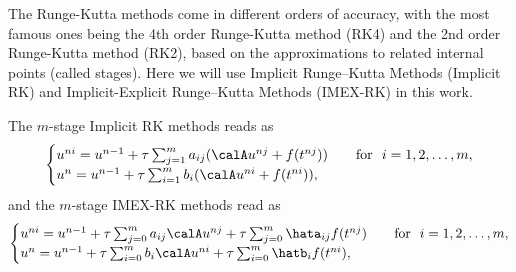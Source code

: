 The Runge-Kutta methods come in different orders of accuracy, 
with the most famous ones being the 4th order Runge-Kutta method 
(RK4) and the 2nd order Runge-Kutta method (RK2), 
based on the approximations to related internal points (called stages). 
Here we will use Implicit Runge--Kutta Methods (Implicit RK) and Implicit-Explicit Runge--Kutta Methods (IMEX-RK) in this work. 

The $m$-stage Implicit RK methods reads as 
\begin{equation}\label{eq:RK-implicit}
    \begin{cases}
    u^{ni} = u^{n-1} + \tau \sum_{j=1}^m a_{ij} (\calA u^{nj} + f(t^{nj})) &\quad \text{for} ~~i=1,2,\dots,m, \\
    u^{n} = u^{n-1} + \tau \sum_{i=1}^m b_i (\calA u^{ni} + f(t^{ni})),
  \end{cases}
\end{equation}
and the $m$-stage IMEX-RK methods read as 
\begin{equation}\label{eq:RK-implicit-explicit}
    \begin{cases}
    u^{ni} = u^{n-1} + \tau \sum_{j=0}^m a_{ij} \calA u^{nj} + \tau \sum_{j=0}^m \hata_{ij} f(t^{nj}) &\quad \text{for} ~~i=1,2,\dots,m, \\
    u^{n} = u^{n-1} + \tau \sum_{i=0}^m b_i \calA u^{ni} + \tau \sum_{i=0}^m \hatb_if(t^{ni}),
  \end{cases}
\end{equation}


